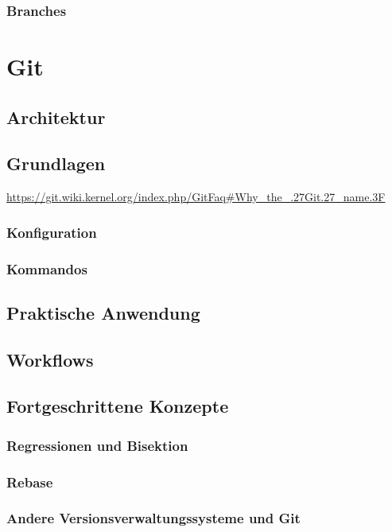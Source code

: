 \subsection{Branches}
\label{sec:Branches}

\chapter{Git}
\label{cha:Git}
\section{Architektur}
\label{sec:Architektur}
\section{Grundlagen}
\label{sec:Grundlagen}
\url{https://git.wiki.kernel.org/index.php/GitFaq#Why_the_.27Git.27_name.3F}
\subsection{Konfiguration}
\label{sec:Konfiguration}
\subsection{Kommandos}
\label{sec:Kommandos}
\section{Praktische Anwendung}
\label{sec:Praxis}
\section{Workflows}
\label{sec:Workflows}
\section{Fortgeschrittene Konzepte}
\label{sec:FortgeschritteneKonzepte}
\subsection{Regressionen und Bisektion}
\label{sec:Regressionen}
\subsection{Rebase}
\label{sec:Rebase}
\subsection{Andere Versionsverwaltungssysteme und Git}
\label{sec:AndereVersionsverwaltungssystemeundGit}
